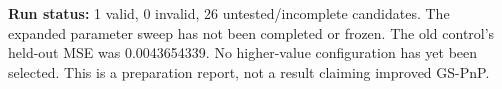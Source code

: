 \textbf{Run status:} 1 valid, 0 invalid, 26 untested/incomplete candidates. The expanded parameter sweep has not been completed or frozen. The old control's held-out MSE was 0.0043654339. No higher-value configuration has yet been selected. This is a preparation report, not a result claiming improved GS-PnP.
